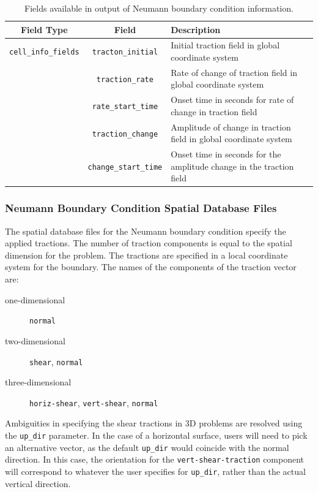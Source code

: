\noindent \begin{center}
\begin{table}[H]
\noindent \centering{}\caption{\label{tab:neumann:output}Fields available in output of Neumann boundary
condition information.}
\medskip{}
\begin{tabular}{|c|c|>{\centering}p{3in}|}
\hline 
\textbf{Field Type} & \textbf{Field} & \textbf{Description}\tabularnewline
\hline 
\hline 
\texttt{cell\_info\_fields} & \texttt{tracton\_initial} & Initial traction field in global coordinate system\tabularnewline
\cline{2-3} 
 & \texttt{traction\_rate} & Rate of change of traction field in global coordinate system\tabularnewline
\cline{2-3} 
 & \texttt{rate\_start\_time} & Onset time in seconds for rate of change in traction field\tabularnewline
\cline{2-3} 
 & \texttt{traction\_change} & Amplitude of change in traction field in global coordinate system\tabularnewline
\cline{2-3} 
 & \texttt{change\_start\_time} & Onset time in seconds for the amplitude change in the traction field\tabularnewline
\hline 
\end{tabular}
\end{table}

\par\end{center}


\subsubsection{Neumann Boundary Condition Spatial Database Files}

The spatial database files for the Neumann boundary condition specify
the applied tractions. The number of traction components is equal
to the spatial dimension for the problem. The tractions are specified
in a local coordinate system for the boundary. The names of the components
of the traction vector are:
\begin{description}
\item [{one-dimensional}] \texttt{normal}
\item [{two-dimensional}] \texttt{shear}, \texttt{normal}
\item [{three-dimensional}] \texttt{horiz-shear}, \texttt{vert-shear},
\texttt{normal}
\end{description}
Ambiguities in specifying the shear tractions in 3D problems are resolved
using the \texttt{up\_dir} parameter. In the case of a horizontal
surface, users will need to pick an alternative vector, as the default
\texttt{up\_dir} would coincide with the normal direction. In this
case, the orientation for the \texttt{vert-shear-traction} component
will correspond to whatever the user specifies for \texttt{up\_dir},
rather than the actual vertical direction.

